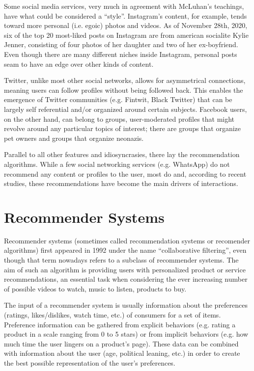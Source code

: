 Some social media services, very much in agreement with McLuhan's teachings,
have what could be considered a ``style''. Instagram's content, for example,
tends toward more personal (i.e. egoic) photos and videos. As of November 28th,
2020, six of the top 20 most-liked posts on Instagram are from american
socialite Kylie Jenner, consisting of four photos of her daughter and two of her
ex-boyfriend. Even though there are many different niches inside Instagram,
personal posts seam to have an edge over other kinds of content.

Twitter, unlike most other social networks, allows for asymmetrical connections,
meaning users can follow profiles without being followed back. This enables the
emergence of Twitter communities (e.g. Fintwit, Black Twitter) that can be
largely self referential and/or organized around certain subjects. Facebook
users, on the other hand, can belong to groups, user-moderated profiles that
might revolve around any particular topics of interest; there are groups that
organize pet owners and groups that organize neonazis.

Parallel to all other features and idiosyncrasies, there lay the recommendation
algorithms. While a few social networking services (e.g. WhatsApp) do not
recommend any content or profiles to the user, most do and, according to recent
studies, these recommendations have become the main drivers of interactions.

\section{Recommender Systems}
\label{sec:recommender_systems}

Recommender systems (sometimes called recommendation systems or recomender
algorithms) first appeared in 1992 under the name ``collaborative filtering'',
even though that term nowadays refers to a subclass of recommender systems. The
aim of such an algorithm is providing users with personalized product or service
recommendations, an essential task when considering the ever increasing number
of possible videos to watch, music to listen, products to buy.

The input of a recommender system is usually information about the preferences
(ratings, likes/dislikes, watch time, etc.) of consumers for a set of items.
Preference information can be gathered from explicit behaviors (e.g. rating a
product in a scale ranging from 0 to 5 stars) or from implicit behaviors (e.g.
how much time the user lingers on a product's page). These data can be combined
with information about the user (age, political leaning, etc.) in order to
create the best possible representation of the user's preferences.

